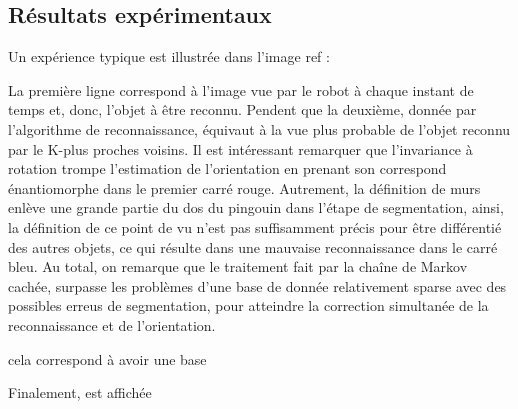 \subsection{Résultats expérimentaux}

Un expérience typique est illustrée dans l'image {\color{green} ref} :

\begin{figure}[H]
\end{figure}

La première ligne correspond à l'image vue par le robot à chaque instant de temps et, donc, l'objet à être reconnu. Pendent que la deuxième, donnée par l'algorithme de reconnaissance, équivaut à la vue plus probable de l'objet reconnu par le K-plus proches voisins. Il est intéressant remarquer que l'invariance à rotation trompe l'estimation de l'orientation en prenant son correspond énantiomorphe dans le premier carré rouge. Autrement, la définition de murs enlève une grande partie du dos du pingouin dans l'étape de segmentation, ainsi, la définition de ce point de vu n'est pas suffisamment précis pour être différentié des autres objets, ce qui résulte dans une mauvaise reconnaissance dans le carré bleu. Au total, on remarque que le traitement fait par la chaîne de Markov cachée, surpasse les problèmes d'une base de donnée relativement sparse avec des possibles erreus de segmentation, pour atteindre la correction simultanée de la reconnaissance et de l'orientation. 

cela correspond à avoir une base

Finalement,  est affichée

